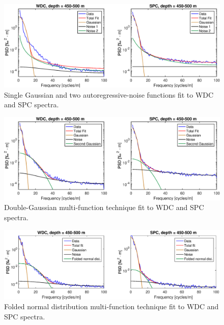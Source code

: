 \documentclass[draft, jgrga]{AGUTeX}
\begin{document}
\begin{figure}
\includegraphics[width=.9\linewidth]{GRR_fits.eps}
\caption{Single Gaussian and two autoregressive-noise functions fit to WDC and SPC spectra.}\label{GRR_fits}
\end{figure}

\begin{figure}
\includegraphics[width=.9\linewidth]{GGR_fits.eps}
\caption{Double-Gaussian multi-function technique fit to WDC and SPC spectra.}\label{GGR_fits}
\end{figure}

\begin{figure}
	\includegraphics[width=1.1\linewidth]{folded_normal_gauss_spectrum.eps}
	\caption{Folded normal distribution multi-function technique fit to WDC and SPC spectra.}\label{folded_normal_gauss_spectrum}
\end{figure}
\end{document}
